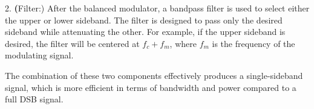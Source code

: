 2. \textbf(Filter:) After the balanced modulator, a bandpass filter is used to select either the upper or lower sideband. The filter is designed to pass only the desired sideband while attenuating the other. For example, if the upper sideband is desired, the filter will be centered at \( f_c + f_m \), where \( f_m \) is the frequency of the modulating signal.

The combination of these two components effectively produces a single-sideband signal, which is more efficient in terms of bandwidth and power compared to a full DSB signal.

